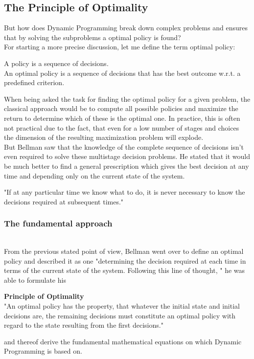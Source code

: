 \documentclass[conference]{IEEEtran}
\begin{document}
\subsection{The Principle of Optimality}
But how does Dynamic Programming break down complex problems and ensures that by solving the subproblems a optimal policy is found?
\\
For starting a more precise discussion, let me define the term optimal policy:
\begin{center}
A policy is a sequence of decisions.\\
An optimal policy is a sequence of decisions that has the best outcome w.r.t. a predefined criterion.
\end{center}
When being asked the task for finding the optimal policy for a given problem, the classical approach would be to compute all possible policies and maximize the return to determine which of these is the optimal one. In practice, this is often not practical due to the fact, that even for a low number of stages and choices the dimension of the resulting maximization problem will explode.
\\
But Bellman saw that the knowledge of the complete sequence of decisions isn't even required to solve these multistage decision problems. He stated that it would be much better to find a general prescription which gives the best decision at any time and depending only on the current state of the system.
\begin{center}
"If at any particular time we know what to do, it is never necessary to know the decisions required at subsequent times."\cite{Bellman.30.07.1954}
\end{center}
\subsubsection{The fundamental approach}
\quad \\
From the previous stated point of view, Bellman went over to define an optimal policy and described it as one "determining the decision required at each time in terms of the current state of the system. Following this line of thought, "\cite{Bellman.30.07.1954} he was able to formulate his 

\begin{center}
\textbf{Principle of Optimality}
\\
"An optimal policy has the property, that whatever the initial state and initial decisions are, the remaining decisions must constitute an optimal policy with regard to the state resulting from the first decisions."\cite{Bellman.30.07.1954}
\end{center} 
and thereof derive the fundamental mathematical equations on which Dynamic Programming is based on.
\\
\end{document}
